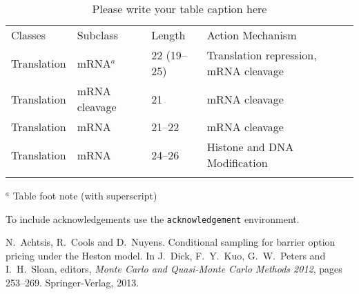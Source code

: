 \documentclass[graybox,footinfo]{svmult}
\begin{document}
%
%
\begin{table}
\caption{Please write your table caption here}\label{tab:1}
%
%
\begin{tabular}{p{2cm}p{2.4cm}p{2cm}p{4.9cm}}
\hline\noalign{\smallskip}
Classes & Subclass & Length & Action Mechanism  \\
\noalign{\smallskip}\svhline\noalign{\smallskip}
Translation & mRNA$^a$  & 22 (19--25) & Translation repression, mRNA cleavage\\
Translation & mRNA cleavage & 21 & mRNA cleavage\\
Translation & mRNA  & 21--22 & mRNA cleavage\\
Translation & mRNA  & 24--26 & Histone and DNA Modification\\
\noalign{\smallskip}\hline\noalign{\smallskip}
\end{tabular}
$^a$ Table foot note (with superscript)
\end{table}

\begin{acknowledgement}
To include acknowledgements use the \verb|acknowledgement| environment.
\end{acknowledgement}


%


%
\begin{thebibliography}{99.}%
\nocite{Slo85,NiePil09a,DicEtal14a,DicHicLiu07a,Clancy2013,SloJoe94}
N.~Achtsis, R.~Cools and D.~Nuyens.
\newblock Conditional sampling for barrier option pricing under the Heston model.
\newblock In J.~Dick, F.~Y.\ Kuo, G.~W.\ Peters and I.~H.\ Sloan, editors, {\em {M}onte {C}arlo
  and Quasi-{M}onte {C}arlo Methods 2012}, pages 253--269. Springer-Verlag, 2013.

\end{thebibliography}
\end{document}
